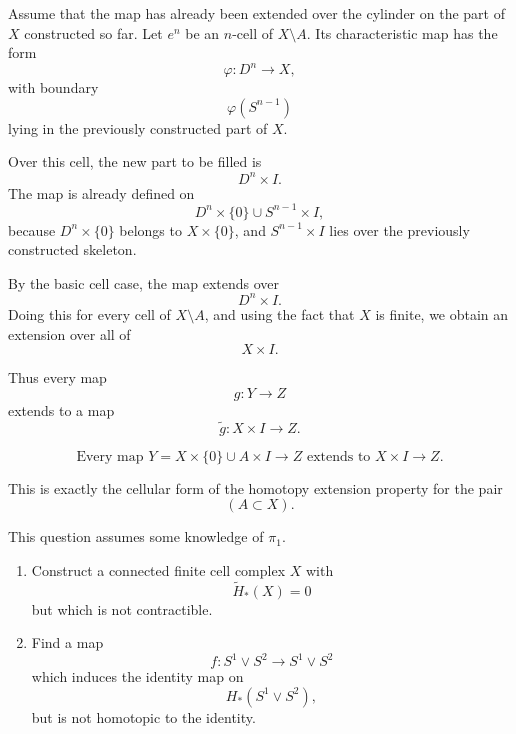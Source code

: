 \begin{solution}
Assume that the map has already been extended over the cylinder on the part of \(X\) constructed so far. Let \(e^n\) be an \(n\)-cell of \(X\setminus A\). Its characteristic map has the form
\[
\varphi:D^n\longrightarrow X,
\]
with boundary
\[
\varphi(S^{n-1})
\]
lying in the previously constructed part of \(X\).

Over this cell, the new part to be filled is
\[
D^n\times I.
\]
The map is already defined on
\[
D^n\times\{0\}\cup S^{n-1}\times I,
\]
because \(D^n\times\{0\}\) belongs to \(X\times\{0\}\), and \(S^{n-1}\times I\) lies over the previously constructed skeleton.

By the basic cell case, the map extends over
\[
D^n\times I.
\]
Doing this for every cell of \(X\setminus A\), and using the fact that \(X\) is finite, we obtain an extension over all of
\[
X\times I.
\]

Thus every map
\[
g:Y\longrightarrow Z
\]
extends to a map
\[
\widetilde g:X\times I\longrightarrow Z.
\]

\[
\boxed{
	\text{Every map }Y=X\times\{0\}\cup A\times I\to Z
	\text{ extends to }X\times I\to Z.
}
\]

This is exactly the cellular form of the homotopy extension property for the pair
\[
(A\subset X).
\]
\end{solution}

\begin{problem}
This question assumes some knowledge of \(\pi_1\).

\begin{enumerate}
	\item[(a)] Construct a connected finite cell complex \(X\) with
	\[
	\widetilde H_*(X)=0
	\]
	but which is not contractible.

	\item[(b)] Find a map
	\[
	f:S^1\vee S^2\to S^1\vee S^2
	\]
	which induces the identity map on
	\[
	H_*(S^1\vee S^2),
	\]
	but is not homotopic to the identity.
\end{enumerate}
\end{problem}

